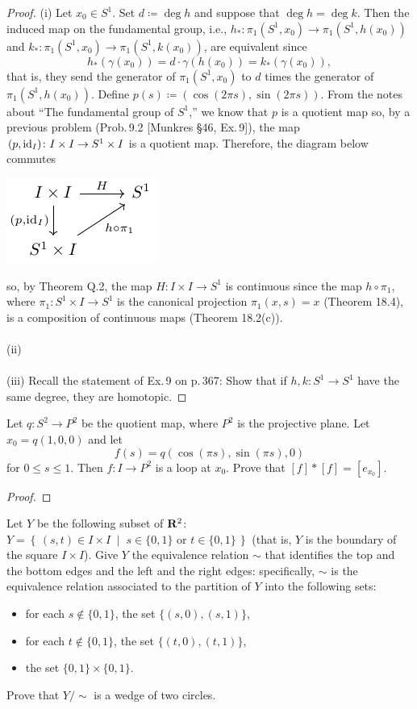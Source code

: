 \begin{proof}
(i) Let $x_0\in S^1$. Set $d\coloneqq\deg h$ and suppose that
$\deg h=\deg k$. Then the induced map on the fundamental group,
i.e., $h_*\colon\pi_1(S^1,x_0)\to\pi_1(S^1,h(x_0))$ and
$k_*\colon\pi_1(S^1,x_0)\to\pi_1(S^1,k(x_0))$, are equivalent
since
\[
h_*(\gamma(x_0))=d\cdot\gamma(h(x_0))=k_*(\gamma(x_0)),
\]
that is, they send the generator of $\pi_1(S^1,x_0)$ to $d$ times
the generator of $\pi_1(S^1,h(x_0))$. Define
$p(s)\coloneqq(\cos(2\pi s),\sin(2\pi s))$. From the notes about
``The fundamental group of $S^1$,'' we know that $p$ is a
quotient map so, by a previous problem (Prob.\,9.2 [Munkres \S46,
Ex.\,9]), the map $(p,\operatorname{id}_I)\colon I\times I\to S^1\times I$ is a
quotient map. Therefore, the diagram below commutes
\begin{center}
\includegraphics{figures/hw-13-degree-diagram}
\end{center}
so, by Theorem Q.2, the map $H\colon I\times I\to S^1$ is
continuous since the map $h\circ\pi_1$, where $\pi_1\colon
S^1\times I\to S^1$ is the canonical projection $\pi_1(x,s)=x$
(Theorem 18.4), is a composition of continuous maps (Theorem
18.2(c)).
\\\\
(ii)
\\\\
(iii) Recall the statement of Ex.\,9 on p.\,367: Show that if $h,k\colon
S^1\to S^1$ have the same degree, they are homotopic.
\end{proof}
\newpage
\begin{problem}[B]
Let $q\colon S^2\to P^2$ be the quotient map, where $P^2$ is the
projective plane. Let $x_0=q(1,0,0)$ and let
\[f(s)=q(\cos(\pi s),\sin(\pi s),0)\]
for $0\leq s\leq 1$. Then $f\colon I\to P^2$ is a loop at
$x_0$. Prove that $[f]*[f]=[e_{x_0}]$.
\end{problem}
\begin{proof}
\end{proof}
\newpage
\begin{problem}[C]
Let $Y$ be the following subset of $\mathbf{R}^2$: $Y=\left\{\,(s,t)\in
  I\times I\;\middle|\;\text{$s\in\{0,1\}$ or
    $t\in\{0,1\}$}\,\right\}$ (that is, $Y$ is the boundary of
the square $I\times I$). Give $Y$ the equivalence relation $\sim$
that identifies the top and the bottom edges and the left and the
right edges: specifically, $\sim$ is the equivalence relation
associated to the partition of $Y$ into the following sets:
\begin{itemize}
\item for each $s\notin\{0,1\}$, the set $\{(s,0),(s,1)\}$,
\item for each $t\notin\{0,1\}$, the set $\{(t,0),(t,1)\}$,
\item the set $\{0,1\}\times\{0,1\}$.
\end{itemize}
Prove that $Y/\sim$ is a wedge of two circles.
\end{problem}
